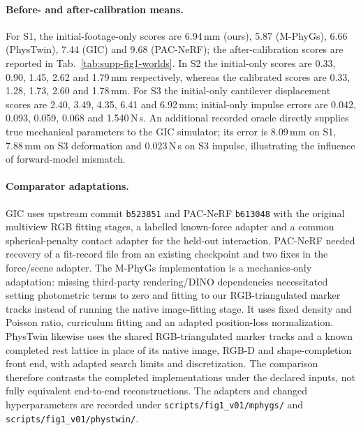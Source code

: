 \paragraph{Before- and after-calibration means.}
For S1, the initial-footage-only scores are 6.94\,mm (ours), 5.87 (M-PhyGs), 6.66 (PhysTwin), 7.44 (GIC) and 9.68 (PAC-NeRF); the after-calibration scores are reported in Tab.~\ref{tab:supp-fig1-worlds}. In S2 the initial-only scores are 0.33, 0.90, 1.45, 2.62 and 1.79\,mm respectively, whereas the calibrated scores are 0.33, 1.28, 1.73, 2.60 and 1.78\,mm. For S3 the initial-only cantilever displacement scores are 2.40, 3.49, 4.35, 6.41 and 6.92\,mm; initial-only impulse errors are 0.042, 0.093, 0.059, 0.068 and 1.540\,N\,s. An additional recorded oracle directly supplies true mechanical parameters to the GIC simulator; its error is 8.09\,mm on S1, 7.88\,mm on S3 deformation and 0.023\,N\,s on S3 impulse, illustrating the influence of forward-model mismatch.

\paragraph{Comparator adaptations.}
GIC uses upstream commit \texttt{b523851} and PAC-NeRF \texttt{b613048} with the original multiview RGB fitting stages, a labelled known-force adapter and a common spherical-penalty contact adapter for the held-out interaction. PAC-NeRF needed recovery of a fit-record file from an existing checkpoint and two fixes in the force/scene adapter. The M-PhyGs implementation is a mechanics-only adaptation: missing third-party rendering/DINO dependencies necessitated setting photometric terms to zero and fitting to our RGB-triangulated marker tracks instead of running the native image-fitting stage. It uses fixed density and Poisson ratio, curriculum fitting and an adapted position-loss normalization. PhysTwin likewise uses the shared RGB-triangulated marker tracks and a known completed rest lattice in place of its native image, RGB-D and shape-completion front end, with adapted search limits and discretization. The comparison therefore contrasts the completed implementations under the declared inputs, not fully equivalent end-to-end reconstructions. The adapters and changed hyperparameters are recorded under \texttt{scripts/fig1\_v01/mphygs/} and \texttt{scripts/fig1\_v01/phystwin/}.

